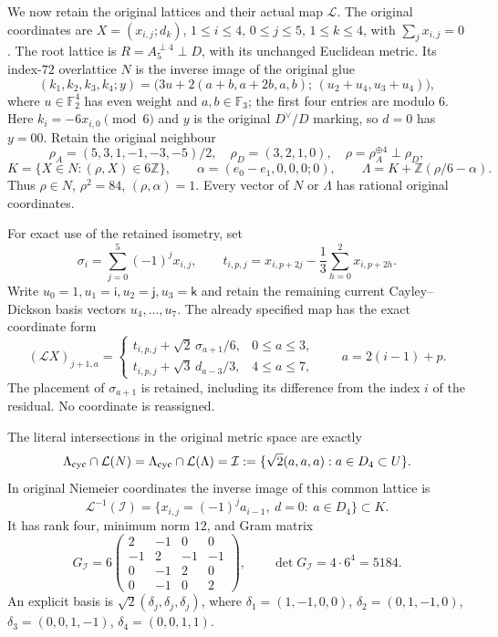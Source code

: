 We now retain the original lattices and their actual map $\mathcal L$.
The original coordinates are $X=(x_{i,j};d_k)$,
$1\le i\le4$, $0\le j\le5$, $1\le k\le4$, with
$\sum_jx_{i,j}=0$. The root lattice is
$R=A_5^{\perp4}\perp D$, with its unchanged Euclidean metric.
Its index-$72$ overlattice $N$ is the inverse image of the original
glue
\[
 (k_1,k_2,k_3,k_4;y)
   =\bigl(3u+2(a+b,a+2b,a,b);\,(u_2+u_4,u_3+u_4)\bigr),
\]
where $u\in\mathbb F_2^4$ has even weight and $a,b\in\mathbb F_3$;
the first four entries are modulo $6$. Here $k_i=-6x_{i,0}\pmod6$
and $y$ is the original $D^\vee/D$ marking, so $d=0$ has $y=00$.
Retain the original neighbour
\[
 \rho_A=(5,3,1,-1,-3,-5)/2,\quad
 \rho_D=(3,2,1,0),\quad \rho=\rho_A^{\oplus4}\perp\rho_D,
\]
\[
 K=\{X\in N:(\rho,X)\in6\mathbb Z\},\qquad
 \alpha=(e_0-e_1,0,0,0;0),\qquad
 \Lambda=K+\mathbb Z(\rho/6-\alpha).
\]
Thus $\rho\in N$, $\rho^2=84$, $(\rho,\alpha)=1$.
Every vector of $N$ or $\Lambda$ has rational original coordinates.

For exact use of the retained isometry, set
\[
 \sigma_i=\sum_{j=0}^5(-1)^jx_{i,j},\qquad
 t_{i,p,j}=x_{i,p+2j}-\frac13\sum_{h=0}^2x_{i,p+2h}.
\]
Write $u_0=1,u_1=\mathsf i,u_2=\mathsf j,u_3=\mathsf k$ and retain
the remaining current Cayley--Dickson basis vectors $u_4,\ldots,u_7$.
The already specified map has the exact coordinate form
\[
 (\mathcal LX)_{j+1,a}=
 \begin{cases}
 t_{i,p,j}+\sqrt2\,\sigma_{a+1}/6,&0\le a\le3,\\
 t_{i,p,j}+\sqrt3\,d_{a-3}/3,&4\le a\le7,
 \end{cases}
 \qquad a=2(i-1)+p.
\]
The placement of $\sigma_{a+1}$ is retained, including its difference
from the index $i$ of the residual. No coordinate is reassigned.

\begin{theorem}\label{wcl:thm:literal-intersection}
The literal intersections in the original metric space are exactly
\begin{equation}
 \Lambda_{\rm cyc}\cap\mathcal L(N)
 =\Lambda_{\rm cyc}\cap\mathcal L(\Lambda)
 =\mathcal I
 :=\{\sqrt2(a,a,a):a\in D_4\subset U\}.
 \label{wcl:eq:literal-common-lattice}
\end{equation}
In original Niemeier coordinates the inverse image of this common
lattice is
\[
 \mathcal L^{-1}(\mathcal I)
 =\{x_{i,j}=(-1)^j a_{i-1},\ d=0:\ a\in D_4\}\subset K.
\]
It has rank four, minimum norm $12$, and Gram matrix
\begin{equation}
 G_{\mathcal I}=6
 \begin{pmatrix}
 2&-1&0&0\\
 -1&2&-1&-1\\
 0&-1&2&0\\
 0&-1&0&2
 \end{pmatrix},
 \qquad\det G_{\mathcal I}=4\cdot6^4=5184.
 \label{wcl:eq:common-gram}
\end{equation}
An explicit basis is $\sqrt2(\delta_j,\delta_j,\delta_j)$,
where
$\delta_1=(1,-1,0,0)$, $\delta_2=(0,1,-1,0)$,
$\delta_3=(0,0,1,-1)$, $\delta_4=(0,0,1,1)$.
\end{theorem}

